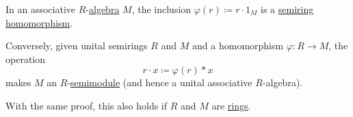 \begin{proposition}\label{thm:algebra_over_semiring_via_homomorphism}
  In an associative \( R \)-\hyperref[def:algebra_over_semiring]{algebra} \( M \), the inclusion \( \varphi(r) \coloneqq r \cdot 1_M \) is a \hyperref[def:semiring/morphism]{semiring homomorphism}.

  Conversely, given unital semirings \( R \) and \( M \) and a homomorphism \( \varphi: R \to M \), the operation
  \begin{equation}\label{eq:thm:algebra_over_semiring_via_homomorphism}
    r \cdot x \coloneqq \varphi(r) \ast x
  \end{equation}
  makes \( M \) an \( R \)-\hyperref[def:semimodule]{semimodule} (and hence a unital associative \( R \)-algebra).
\end{proposition}
\begin{comments}
  \item With the same proof, this also holds if \( R \) and \( M \) are \hyperref[def:ring]{rings}.
\end{comments}
